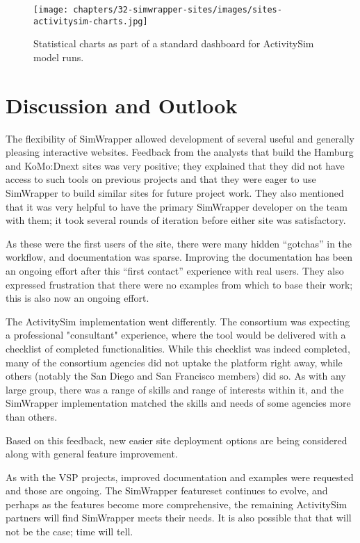 \begin{figure}[ht]
  \centering
  \texttt{[image: chapters/32-simwrapper-sites/images/sites-activitysim-charts.jpg]}
  \caption{Statistical charts as part of a standard dashboard for ActivitySim model runs.}
  \label{fig:sites-activitysi-charts}
\end{figure}

\section{Discussion and Outlook}
\label{sites-discussion}

The flexibility of SimWrapper allowed development of several useful and generally pleasing interactive websites. Feedback from the analysts that build the Hamburg and KoMo:Dnext sites was very positive; they explained that they did not have access to such tools on previous projects and that they were eager to use SimWrapper to build similar sites for future project work. They also mentioned that it was very helpful to have the primary SimWrapper developer on the team with them; it took several rounds of iteration before either site was satisfactory.

As these were the first users of the site, there were many hidden ``gotchas'' in the workflow, and documentation was sparse. Improving the documentation has been an ongoing effort after this ``first contact'' experience with real users. They also expressed frustration that there were no examples from which to base their work; this is also now an ongoing effort.

The ActivitySim implementation went differently. The consortium was expecting a professional "consultant" experience, where the tool would be delivered with a checklist of completed functionalities. While this checklist was indeed completed, many of the consortium agencies did not uptake the platform right away, while others (notably the San Diego and San Francisco members) did so. As with any large group, there was a range of skills and range of interests within it, and the SimWrapper implementation matched the skills and needs of some agencies more than others.

Based on this feedback, new easier site deployment options are being considered along with general feature improvement.

As with the VSP projects, improved documentation and examples were requested and those are ongoing. The SimWrapper featureset continues to evolve, and perhaps as the features become more comprehensive, the remaining ActivitySim partners will find SimWrapper meets their needs. It is also possible that that will not be the case; time will tell.

